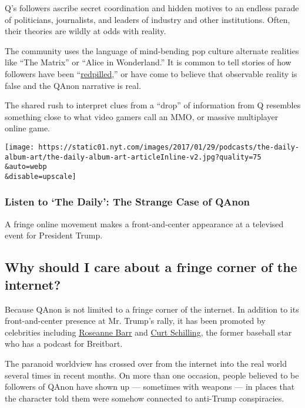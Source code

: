 Q's followers ascribe secret coordination and hidden motives to an
endless parade of politicians, journalists, and leaders of industry and
other institutions. Often, their theories are wildly at odds with
reality.

The community uses the language of mind-bending pop culture alternate
realities like ``The Matrix'' or ``Alice in Wonderland.'' It is common
to tell stories of how followers have been
``\href{https://www.urbandictionary.com/define.php?term=red\%20pill}{redpilled},''
or have come to believe that observable reality is false and the QAnon
narrative is real.

The shared rush to interpret clues from a ``drop'' of information from Q
resembles something close to what video gamers call an MMO, or massive
multiplayer online game.

\texttt{[image: https://static01.nyt.com/images/2017/01/29/podcasts/the-daily-album-art/the-daily-album-art-articleInline-v2.jpg?quality=75\\\&auto=webp\\\&disable=upscale]}

\hypertarget{listen-to-the-daily-the-strange-case-of-qanon}{%
\subsubsection{Listen to `The Daily': The Strange Case of
QAnon}\label{listen-to-the-daily-the-strange-case-of-qanon}}

A fringe online movement makes a front-and-center appearance at a
televised event for President Trump.

\hypertarget{why-should-i-care-about-a-fringe-corner-of-the-internet}{%
\subsection{Why should I care about a fringe corner of the
internet?}\label{why-should-i-care-about-a-fringe-corner-of-the-internet}}

Because QAnon is not limited to a fringe corner of the internet. In
addition to its front-and-center presence at Mr. Trump's rally, it has
been promoted by celebrities including
\href{https://www.nytimes.com/2018/05/29/arts/television/twitter-posts-roseanne-barr.html}{Roseanne
Barr} and
\href{https://www.thedailybeast.com/curt-schilling-backs-pro-trump-qanon-conspiracy-theory}{Curt
Schilling}, the former baseball star who has a podcast for Breitbart.

The paranoid worldview has crossed over from the internet into the real
world several times in recent months. On more than one occasion, people
believed to be followers of QAnon have shown up --- sometimes with
weapons --- in places that the character told them were somehow
connected to anti-Trump conspiracies.


